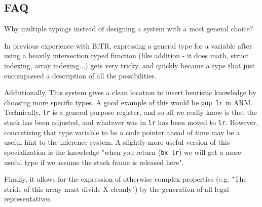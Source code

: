 \documentclass{article}
\begin{document}
\subsection{FAQ}
Why multiple typings instead of designing a system with a most general choice?

In previous experience with BiTR, expressing a general type for a variable after using a heavily intersection typed function (like addition - it does math, struct indexing, array indexing...) gets very tricky, and quickly became a type that just encompassed a description of all the possibilities.

Addtitionally, This system gives a clean location to insert heuristic knowledge by choosing more specific types.
A good example of this would be \texttt{pop lr} in ARM.
Technically, \texttt{lr} is a general purpose register, and so all we really know is that the stack has been adjusted, and whatever was in \texttt{lr} has been moved to \texttt{lr}.
However, concretizing that type variable to be a code pointer ahead of time may be a useful hint to the inference system.
A slightly more useful version of this specialization is the knowledge "when you return (\texttt{bx lr}) we will get a more useful type if we assume the stack frame is released here".

Finally, it allows for the expression of otherwise complex properties (e.g. "The stride of this array must divide X cleanly") by the generation of all legal representatives.
\end{document}
